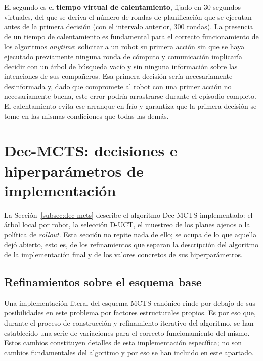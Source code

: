 El segundo es el \textbf{tiempo virtual de calentamiento}, fijado en $30$ segundos virtuales, del que se deriva el número de rondas de planificación que se ejecutan antes de la primera decisión (con el intervalo anterior, $300$ rondas). La presencia de un tiempo de calentamiento es fundamental para el correcto funcionamiento de los algoritmos \textit{anytime}: solicitar a un robot su primera acción sin que se haya ejecutado previamente ninguna ronda de cómputo y comunicación implicaría decidir con un árbol de búsqueda vacío y sin ninguna información sobre las intenciones de sus compañeros. Esa primera decisión sería necesariamente desinformada y, dado que compromete al robot con una primer acción no necesariamente buena, este error podría arrastrarse durante el episodio completo. El calentamiento evita ese arranque en frío y garantiza que la primera decisión se tome en las mismas condiciones que todas las demás.

\section{Dec-MCTS: decisiones e hiperparámetros de implementación} \label{sec:mat-decmcts}

La Sección~\ref{subsec:dec-mcts} describe el algoritmo Dec-MCTS implementado: el árbol local por robot, la selección D-UCT, el muestreo de los planes ajenos o la política de \textit{rollout}. Esta sección no repite nada de ello; se ocupa de lo que aquella dejó abierto, esto es, de los refinamientos que separan la descripción del algoritmo de la implementación final y de los valores concretos de sus hiperparámetros.


\subsection{Refinamientos sobre el esquema base} \label{subsec:mat-decmcts-refinamientos}

Una implementación literal del esquema MCTS canónico rinde por debajo de sus posibilidades en este problema por factores estructurales propios. Es por eso que, durante el proceso de construcción y refinamiento iterativo del algoritmo, se han establecido una serie de variaciones para el correcto funcionamiento del mismo. Estos cambios constituyen detalles de esta implementación específica; no son cambios fundamentales del algoritmo y por eso se han incluido en este apartado.

